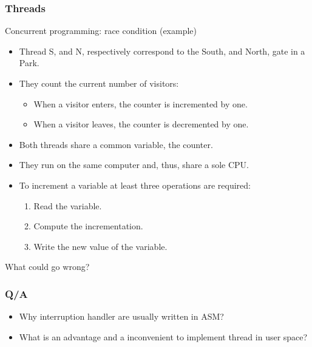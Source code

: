   \begin{frame}
    \frametitle{Threads}
        \begin{block}{Concurrent programming: race condition (example)}
          \begin{itemize}
            \item Thread S, and N, respectively correspond to the South, and North, gate in a Park.
            \item They count the current number of visitors:
            \begin{itemize}
              \item When a visitor enters, the counter is incremented by one.
              \item When a visitor leaves, the counter is decremented by one.
            \end{itemize}
            \item Both threads share a common variable, the counter.
            \item They run on the same computer and, thus, share a sole CPU.
            \item To increment a variable at least three operations are required:
            \begin{enumerate}
              \item Read the variable.
              \item Compute the incrementation.
              \item Write the new value of the variable.
            \end{enumerate}
          \end{itemize}
        \end{block}
	What could go wrong?
  \end{frame}

  \begin{frame}
    \frametitle{Q/A}
    \begin{itemize}
      \item Why interruption handler are usually written in ASM? %
      \item What is an advantage and a inconvenient to implement thread in user space? %
    \end{itemize}
  \end{frame}
